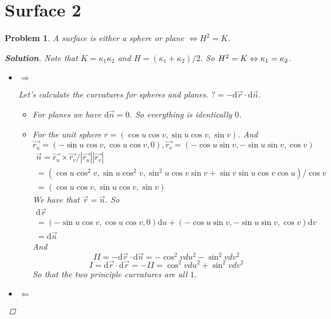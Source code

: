 \documentclass[11pt]{article}
\newtheorem{problem}{Problem}
\numberwithin{problem}{section}
\newcommand{\dd}{\mathrm{d}}
\newenvironment{solution}
               {\let\oldqedsymbol=\qedsymbol
                \renewcommand{\qedsymbol}{$\blacktriangleleft$}
                \begin{proof}[\bfseries\upshape Solution]}
               {\end{proof}
                \renewcommand{\qedsymbol}{\oldqedsymbol}}
\begin{document}
\section{Surface 2}



\begin{problem}

A surface is either a sphere or plane $\Leftrightarrow H^2 = K$. 

\begin{solution}


Note that $K=\kappa_1 \kappa_2$ and $H = (\kappa_1 + \kappa_2) / 2$. So $H^2=K\Leftrightarrow\\ \kappa_1 = \kappa_2$.

\begin{itemize}

\item $\Rightarrow$


Let's calculate the curvatures for spheres and planes. $?=-\dd \vec{r} \cdot \dd \vec{n}$.
\begin{itemize}

\item For planes we have $\dd \vec{n} = 0$. So everything is identically $0$.

\item For the unit sphere $r = (\cos u \cos v, \sin u \cos v, \sin v )$.
And
$$\vec{r_u}= (-\sin u \cos v, \cos u \cos v, 0), \vec{r_v} = (-\cos u \sin v, -\sin u \sin v, \cos v) $$
\begin{multline}
\vec{n} = \vec{r_u} \times \vec{r_v} / |\vec{r_u}| |\vec{r_v}| \\ =  (\cos u \cos ^2 v, \sin u \cos^2 v, \sin^2 u \cos v \sin v +\sin v \sin u \cos v \cos u)/\cos v \\ = (\cos u \cos v, \sin u \cos v, \sin v)
\end{multline}
We have that $\vec{r} = \vec{n}$. So
\begin{multline}
\dd \vec{r} \\ = (-\sin u \cos v, \cos u \cos v, 0)\dd u + (-\cos u \sin v, -\sin u \sin v, \cos v) \dd v \\ = \dd \vec{n}
\end{multline}
And
\begin{equation}
II = -\dd \vec{r} \cdot \dd \vec{n} = - \cos^2 v du^2 - \sin^2 v dv^2
\end{equation}
\begin{equation}
I = \dd \vec{r} \cdot \dd \vec{r} = -II = \cos^2 v du^2 + \sin^2 v dv^2
\end{equation}
So that the two principle curvatures are all $1$.

\end{itemize}

\item $\Leftarrow$

\end{itemize}







\end{solution}
\end{problem}
\end{document}
